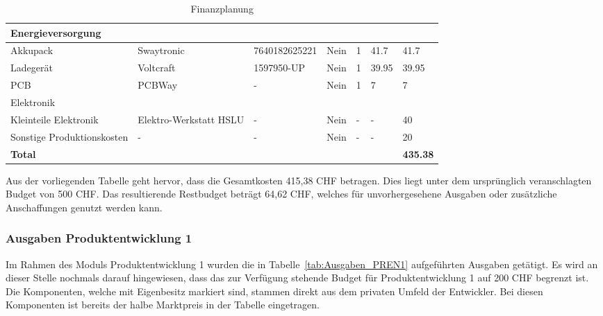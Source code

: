 \documentclass[main.tex]{subfiles} %
\begin{document}
\begin{table}[h]
\begin{tabular}{|p{3cm}|p{2.5cm}|p{3cm}|p{1cm}|p{1cm}|p{1.5cm}|p{1cm}|}
        \rowcolor{lightgray} Energieversorgung &                       &                         &                 &                &                           &                             \\ \hline
        Akkupack                               & Swaytronic            & 7640182625221           & Nein            & 1              & 41.7                      & 41.7                        \\ \hline
        Ladegerät                              & Voltcraft             & 1597950-UP              & Nein            & 1              & 39.95                     & 39.95                       \\ \hline
        PCB                                    & PCBWay                & -                       & Nein            & 1              & 7                         & 7                           \\ \hline
        \rowcolor{lightgray} Elektronik        &                       &                         &                 &                &                           &                             \\ \hline
        Kleinteile Elektronik                  & Elektro-Werkstatt HSLU& -                       & Nein            & -              & -                         & 40                          \\ \hline
        Sonstige Produktionskosten             & -                     & -                       & Nein            & -              & -                         & 20                          \\ \hline
        \textbf{Total}                         &                       &                         &                 &                &                           & \textbf{435.38}             \\ \hline
    \end{tabular}
    \caption{Finanzplanung}
    \label{tab:Budgetplanung}
\end{table}

Aus der vorliegenden Tabelle geht hervor, dass die Gesamtkosten 415,38 CHF betragen.
Dies liegt unter dem ursprünglich veranschlagten Budget von 500 CHF. 
Das resultierende Restbudget beträgt 64,62 CHF, welches für unvorhergesehene Ausgaben oder zusätzliche
Anschaffungen genutzt werden kann.

\subsubsection{Ausgaben Produktentwicklung 1}
Im Rahmen des Moduls Produktentwicklung 1 wurden die in
Tabelle~\ref{tab:Ausgaben_PREN1} aufgeführten Ausgaben getätigt. Es wird 
an dieser Stelle nochmals darauf hingewiesen, dass das zur Verfügung stehende 
Budget für Produktentwicklung 1 auf 200 CHF begrenzt ist. Die Komponenten, welche mit 
Eigenbesitz markiert sind, stammen direkt aus dem privaten Umfeld der Entwickler.
Bei diesen Komponenten ist bereits der halbe Marktpreis in der Tabelle eingetragen.
\end{document}
